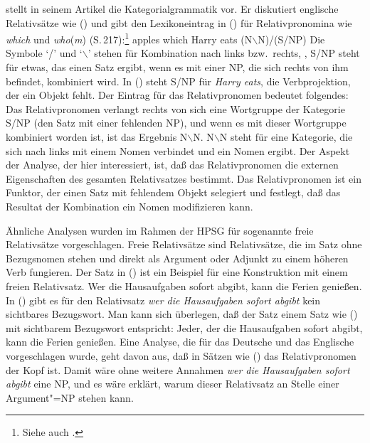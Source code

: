 \citet{Steedman89a} stellt in seinem Artikel die Kategorialgrammatik vor.
Er diskutiert englische Relativsätze wie () und gibt den
Lexikoneintrag in () für Relativpronomina wie \emph{which} und \emph{who}(\emph{m})
(S.\,217):\footnote{
  Siehe auch .
}
\ea
apples which Harry eats
\z
\ea
(N$\backslash$N)/(S/NP)
\z
Die Symbole `/' und `$\backslash$' stehen für Kombination nach links bzw.\
rechts, \dash, S/NP steht für etwas, das einen Satz ergibt, wenn es mit einer NP,
die sich rechts von ihm befindet, kombiniert wird. In (\mex{0}) steht
S/NP für \emph{Harry eats}, \dash die Verbprojektion, der ein Objekt fehlt.
Der Eintrag für das Relativpronomen bedeutet folgendes: Das Relativpronomen
verlangt rechts von sich eine Wortgruppe der Kategorie S/NP (den Satz mit einer
fehlenden NP), und wenn es mit dieser Wortgruppe kombiniert worden ist, ist das
Ergebnis N$\backslash$N. N$\backslash$N steht für eine Kategorie, die sich
nach links mit einem Nomen verbindet und ein Nomen ergibt. 
Der Aspekt der Analyse, der hier interessiert, ist, daß das Relativpronomen
die externen Eigenschaften des gesamten Relativsatzes bestimmt. Das Relativpronomen
ist ein Funktor, der einen Satz mit fehlendem Objekt selegiert und festlegt,
daß das Resultat der Kombination ein Nomen modifizieren kann.

Ähnliche Analysen wurden im Rahmen der HPSG für sogenannte freie Relativsätze
vorgeschlagen. Freie Relativsätze sind Relativsätze, die im Satz ohne Bezugsnomen
stehen und direkt als Argument oder Adjunkt zu einem höheren Verb fungieren.
Der Satz in (\mex{1}) ist ein Beispiel für eine Konstruktion mit einem freien Relativsatz.
\ea
Wer die Hausaufgaben sofort abgibt, kann die Ferien genießen.
\z
In () gibt es für den Relativsatz \emph{wer die Hausaufgaben sofort abgibt} kein
sichtbares Bezugswort. Man kann sich überlegen, daß der Satz einem Satz wie (\mex{1})
mit sichtbarem Bezugswort entspricht:
\ea
Jeder, der die Hausaufgaben sofort abgibt, kann die Ferien genießen.
\z
Eine Analyse, die für das Deutsche \citep{Kubota2002a} und das Englische \citep{WK03a}
vorgeschlagen wurde, geht davon aus, daß in Sätzen wie () das Relativpronomen der Kopf ist.
Damit wäre ohne weitere Annahmen \emph{wer die Hausaufgaben sofort abgibt} eine NP,
und es wäre erklärt, warum dieser Relativsatz an Stelle einer Argument"=NP stehen kann.

